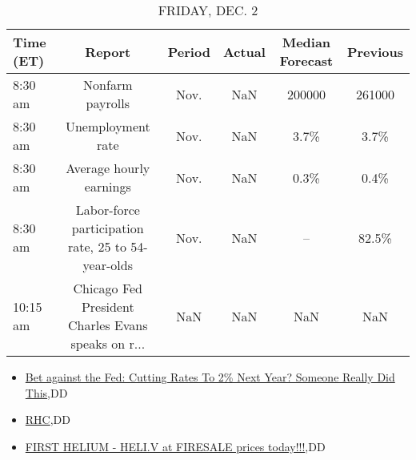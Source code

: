 \documentclass{article}%
\begin{document}
%


\begin{table}[htbp]%
\caption{FRIDAY, DEC. 2}%
\centering%
\begin{adjustbox}{width=1\textwidth}%
\begin{tabular}{lccccc}
\toprule
Time (ET) &                                             Report & Period & Actual & Median Forecast & Previous \\
\midrule
  8:30 am &                                   Nonfarm payrolls &   Nov. &    NaN &          200000 &   261000 \\
  8:30 am &                                  Unemployment rate &   Nov. &    NaN &            3.7\% &     3.7\% \\
  8:30 am &                            Average hourly earnings &   Nov. &    NaN &            0.3\% &     0.4\% \\
  8:30 am & Labor-force participation rate, 25 to 54-year-olds &   Nov. &    NaN &              -- &    82.5\% \\
 10:15 am & Chicago Fed President Charles Evans speaks on r... &    NaN &    NaN &             NaN &      NaN \\
\bottomrule
\end{tabular}
%
\end{adjustbox}%
\end{table}

%
\begin{itemize}%
\item%
\href{https://reddit.com/r/wallstreetbets/comments/z7sx6f/bet\_against\_the\_fed\_cutting\_rates\_to\_2\_next\_year/}{Bet against the Fed: Cutting Rates To 2\% Next Year? Someone Really Did This},DD%
\item%
\href{https://reddit.com/r/Baystreetbets/comments/z7a1h9/rhc/}{RHC},DD%
\item%
\href{https://reddit.com/r/Baystreetbets/comments/z711mg/first\_helium\_heliv\_at\_firesale\_prices\_today/}{FIRST HELIUM - HELI.V at FIRESALE prices today!!!},DD%
\end{itemize}%
\end{document}
